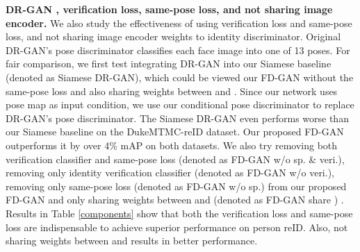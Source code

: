 \documentclass{article}
\begin{document}
\textbf{DR-GAN \cite{tran2017disentangled}, verification loss, same-pose loss, and not sharing image encoder.}
We also study the effectiveness of using verification loss and same-pose loss, and not sharing image encoder weights to identity discriminator. 
Original DR-GAN's pose discriminator classifies each face image into one of 13 poses. For fair comparison, we first test integrating DR-GAN into our Siamese baseline (denoted as Siamese DR-GAN), which could be viewed our FD-GAN without the same-pose loss and also sharing weights between  and . Since our network uses pose map as input condition, we use our conditional pose discriminator  to replace DR-GAN's pose discriminator. The Siamese DR-GAN even performs worse than our Siamese baseline on the DukeMTMC-reID dataset. Our proposed FD-GAN outperforms it by over 4\% mAP on both datasets. We also try removing both verification classifier and same-pose loss (denoted as FD-GAN w/o sp. \& veri.), removing only identity verification classifier (denoted as FD-GAN w/o veri.), removing only same-pose loss (denoted as FD-GAN w/o sp.) from our proposed FD-GAN and only sharing weights between  and  (denoted as FD-GAN share ) . Results in Table \ref{components} show that both the verification loss and same-pose loss are indispensable to achieve superior performance on person reID. Also, not sharing weights between  and  results in better performance.
\end{document}
